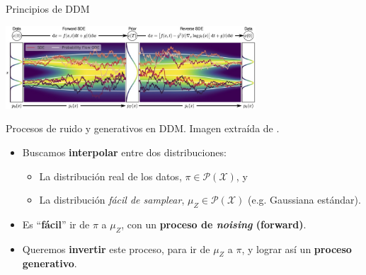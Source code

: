 \documentclass[aspectratio=169,xcolor=dvipsnames, t, spanish]{beamer}
\begin{document}
    \begin{frame}{Principios de DDM}\vspace{-6mm}
        \begin{center}
            \includegraphics[width=0.7\textwidth]{figures/DDM2.jpg}

            \footnotesize Procesos de ruido y generativos en DDM. Imagen extraída de \citet{Song2020b}.
        \end{center}
        \begin{itemize}
            \item Buscamos \textbf{interpolar} entre dos distribuciones:
            \begin{itemize}
                \item La distribución real de los datos, $\pi\in\mathcal{P}(\mathcal{X})$, y
                \item La distribución \textit{fácil de samplear}, $\mu_Z \in\mathcal{P}(\mathcal{X})$ (e.g. Gaussiana estándar).
            \end{itemize}
            \item Es ``\textbf{fácil}'' ir de $\pi$ a $\mu_Z$, con un \textbf{proceso de \textit{noising} (forward)}.
            \item Queremos \textbf{invertir} este proceso, para ir de $\mu_Z$ a $\pi$, y lograr así un \textbf{proceso generativo}.
        \end{itemize}
    \end{frame}
    
\end{document}
